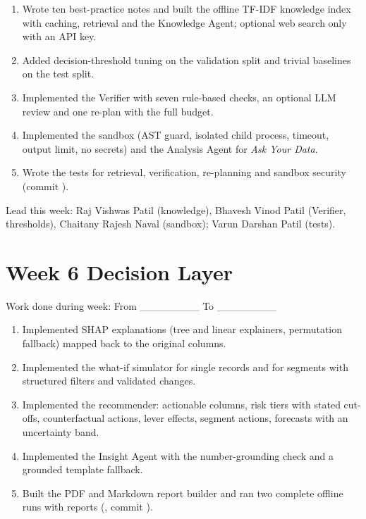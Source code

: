 \begin{enumerate}
  \item Wrote ten best-practice notes and built the offline TF-IDF knowledge index with caching, retrieval and the Knowledge Agent; optional web search only with an API key.
  \item Added decision-threshold tuning on the validation split and trivial baselines on the test split.
  \item Implemented the Verifier with seven rule-based checks, an optional LLM review and one re-plan with the full budget.
  \item Implemented the sandbox (AST guard, isolated child process, timeout, output limit, no secrets) and the Analysis Agent for \textit{Ask Your Data}.
  \item Wrote the tests for retrieval, verification, re-planning and sandbox security (commit ).
\end{enumerate}

Lead this week: Raj Vishwas Patil (knowledge), Bhavesh Vinod Patil (Verifier, thresholds), Chaitany Rajesh Naval (sandbox); Varun Darshan Patil (tests).

\FloatBarrier
\setcounter{secnumdepth}{0}
\section{Week 6 \textemdash{} Decision Layer}
\setcounter{secnumdepth}{2}

Work done during week: From \_\_\_\_\_\_\_\_ To \_\_\_\_\_\_\_\_

\begin{enumerate}
  \item Implemented SHAP explanations (tree and linear explainers, permutation fallback) mapped back to the original columns.
  \item Implemented the what-if simulator for single records and for segments with structured filters and validated changes.
  \item Implemented the recommender: actionable columns, risk tiers with stated cut-offs, counterfactual actions, lever effects, segment actions, forecasts with an uncertainty band.
  \item Implemented the Insight Agent with the number-grounding check and a grounded template fallback.
  \item Built the PDF and Markdown report builder and ran two complete offline runs with reports (, commit ).
\end{enumerate}

